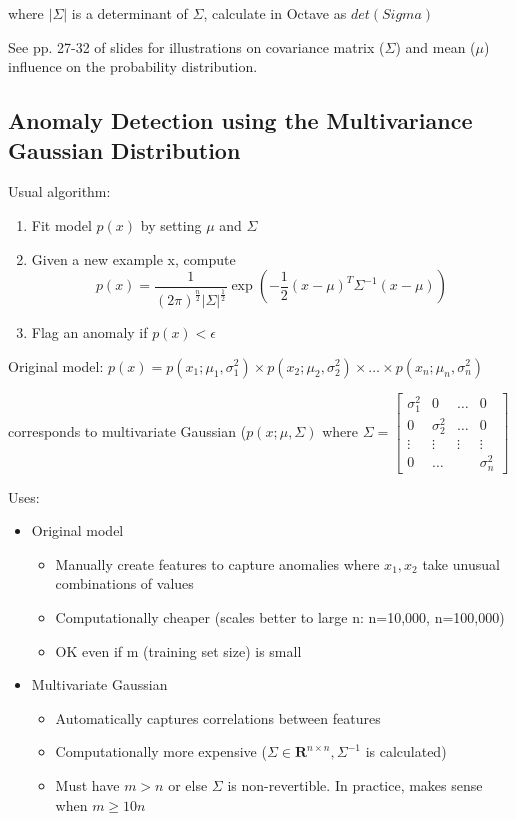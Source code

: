 \documentclass{scrartcl}
\begin{document}
where $|\Sigma|$ is a determinant of $\Sigma$, calculate in Octave as $det(Sigma)$

See pp. 27-32 of slides for illustrations on covariance matrix
($\Sigma$) and mean ($\mu$) influence on the probability distribution.

\subsection{Anomaly Detection using the Multivariance Gaussian Distribution}
\label{sec:15-8}

Usual algorithm:
\begin{enumerate}
\item Fit model $p(x)$ by setting $\mu$ and $\Sigma$
\item Given a new example x, compute \[ p(x) = \frac{1}{(2
    \pi)^{\frac{n}{2}} |\Sigma|^{\frac{1}{2}}} \exp(-\frac{1}{2}(x -
  \mu)^T \Sigma^{-1}(x-\mu)) \]
\item Flag an anomaly if $p(x) < \epsilon$
\end{enumerate}

Original model: $p(x) = p(x_1; \mu_1, \sigma_1^2) \times p(x_2; \mu_2,
\sigma_2^2) \times \dots \times p(x_n; \mu_n, \sigma_n^2)$

corresponds to multivariate Gaussian ($p(x; \mu, \Sigma)$ where
$\Sigma = \left[
  \begin{array}{cccc}
    \sigma_1^2 & 0 & \dots & 0 \\
    0  & \sigma_2^2 & \dots &0 \\
    \vdots & \vdots & \vdots & \vdots \\
    0 & \dots & & \sigma_n^2 
  \end{array}
\right] $

Uses:
\begin{itemize}
\item Original model
  \begin{itemize}
  \item Manually create features to capture anomalies where $x_1, x_2$
    take unusual combinations of values
  \item Computationally cheaper (scales better to large n: n=10,000,
    n=100,000)
  \item OK even if m (training set size) is small
  \end{itemize}
\item Multivariate Gaussian
  \begin{itemize}
  \item Automatically captures correlations between features
  \item Computationally more expensive ($\Sigma \in \mathbf{R}^{n
      \times n}, \Sigma^{-1}$ is calculated)
  \item Must have $m > n$ or else $\Sigma$ is non-revertible. In
    practice, makes sense when $m \geq 10n$
  \end{itemize}
\end{itemize}
\end{document}

